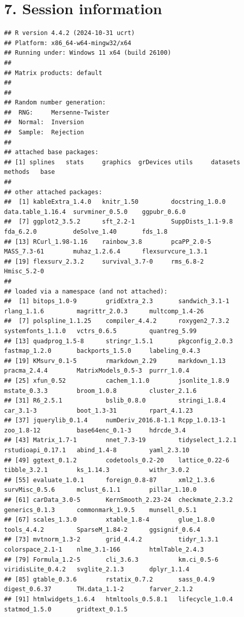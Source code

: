 \documentclass[
]{article}
\begin{document}
\clearpage

\section{7. Session information}\label{session-information}

\begin{verbatim}
## R version 4.4.2 (2024-10-31 ucrt)
## Platform: x86_64-w64-mingw32/x64
## Running under: Windows 11 x64 (build 26100)
## 
## Matrix products: default
## 
## 
## Random number generation:
##  RNG:     Mersenne-Twister 
##  Normal:  Inversion 
##  Sample:  Rejection 
##  
## attached base packages:
## [1] splines   stats     graphics  grDevices utils     datasets  methods   base     
## 
## other attached packages:
##  [1] kableExtra_1.4.0   knitr_1.50         docstring_1.0.0    data.table_1.16.4  survminer_0.5.0    ggpubr_0.6.0      
##  [7] ggplot2_3.5.2      sft_2.2-1          SuppDists_1.1-9.8  fda_6.2.0          deSolve_1.40       fds_1.8           
## [13] RCurl_1.98-1.16    rainbow_3.8        pcaPP_2.0-5        MASS_7.3-61        muhaz_1.2.6.4      flexsurvcure_1.3.1
## [19] flexsurv_2.3.2     survival_3.7-0     rms_6.8-2          Hmisc_5.2-0       
## 
## loaded via a namespace (and not attached):
##  [1] bitops_1.0-9        gridExtra_2.3       sandwich_3.1-1      rlang_1.1.6         magrittr_2.0.3      multcomp_1.4-26    
##  [7] polspline_1.1.25    compiler_4.4.2      roxygen2_7.3.2      systemfonts_1.1.0   vctrs_0.6.5         quantreg_5.99      
## [13] quadprog_1.5-8      stringr_1.5.1       pkgconfig_2.0.3     fastmap_1.2.0       backports_1.5.0     labeling_0.4.3     
## [19] KMsurv_0.1-5        rmarkdown_2.29      markdown_1.13       pracma_2.4.4        MatrixModels_0.5-3  purrr_1.0.4        
## [25] xfun_0.52           cachem_1.1.0        jsonlite_1.8.9      mstate_0.3.3        broom_1.0.8         cluster_2.1.6      
## [31] R6_2.5.1            bslib_0.8.0         stringi_1.8.4       car_3.1-3           boot_1.3-31         rpart_4.1.23       
## [37] jquerylib_0.1.4     numDeriv_2016.8-1.1 Rcpp_1.0.13-1       zoo_1.8-12          base64enc_0.1-3     hdrcde_3.4         
## [43] Matrix_1.7-1        nnet_7.3-19         tidyselect_1.2.1    rstudioapi_0.17.1   abind_1.4-8         yaml_2.3.10        
## [49] ggtext_0.1.2        codetools_0.2-20    lattice_0.22-6      tibble_3.2.1        ks_1.14.3           withr_3.0.2        
## [55] evaluate_1.0.1      foreign_0.8-87      xml2_1.3.6          survMisc_0.5.6      mclust_6.1.1        pillar_1.10.0      
## [61] carData_3.0-5       KernSmooth_2.23-24  checkmate_2.3.2     generics_0.1.3      commonmark_1.9.5    munsell_0.5.1      
## [67] scales_1.3.0        xtable_1.8-4        glue_1.8.0          tools_4.4.2         SparseM_1.84-2      ggsignif_0.6.4     
## [73] mvtnorm_1.3-2       grid_4.4.2          tidyr_1.3.1         colorspace_2.1-1    nlme_3.1-166        htmlTable_2.4.3    
## [79] Formula_1.2-5       cli_3.6.3           km.ci_0.5-6         viridisLite_0.4.2   svglite_2.1.3       dplyr_1.1.4        
## [85] gtable_0.3.6        rstatix_0.7.2       sass_0.4.9          digest_0.6.37       TH.data_1.1-2       farver_2.1.2       
## [91] htmlwidgets_1.6.4   htmltools_0.5.8.1   lifecycle_1.0.4     statmod_1.5.0       gridtext_0.1.5
\end{verbatim}
\end{document}
